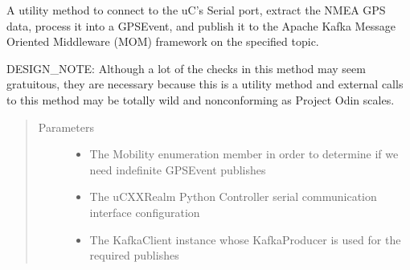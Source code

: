 \documentclass[letterpaper,10pt,english]{sphinxmanual}
\begin{document}

\begin{fulllineitems}
\label{\detokenize{Forge:Forge.gps_fetch_publish}}
\sphinxAtStartPar
A utility method to connect to the uC’s Serial port, extract the NMEA GPS data, process it into a GPSEvent, and
publish it to the Apache Kafka Message Oriented Middleware (MOM) framework on the specified topic.

\sphinxAtStartPar
DESIGN\_NOTE: Although a lot of the checks in this method may seem gratuitous, they are necessary because this
is a utility method and external calls to this method may be totally wild and non\sphinxhyphen{}conforming as Project
Odin scales.
\begin{quote}\begin{description}
\item[{Parameters}] \leavevmode\begin{itemize}
\item {} 
\sphinxAtStartPar
{} \textendash{} The Mobility enumeration member in order to determine if we need indefinite GPSEvent publishes

\item {} 
\sphinxAtStartPar
{} \textendash{} The uC\sphinxhyphen{}XXRealm Python Controller serial communication interface configuration

\item {} 
\sphinxAtStartPar
{} \textendash{} The KafkaClient instance whose KafkaProducer is used for the required publishes


\end{itemize}
\end{description}
\end{quote}
\end{fulllineitems}
\end{document}
